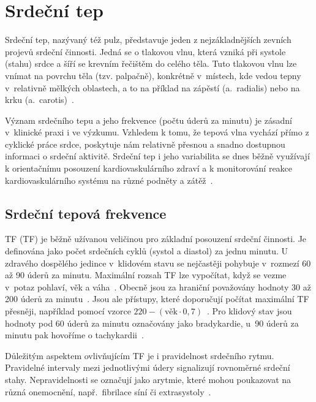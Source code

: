 \chapter{Srdeční tep}
\label{chap:srdecni_tep}

Srdeční tep, nazývaný též pulz, představuje jeden z nejzákladnějších zevních projevů srdeční činnosti.
Jedná se o tlakovou vlnu, která vzniká při systole (stahu) srdce a šíří se krevním řečištěm do celého těla.
Tuto tlakovou vlnu lze vnímat na povrchu těla (tzv. palpačně), konkrétně v~místech, kde vedou tepny v~relativně mělkých oblastech, a to na příklad na zápěstí (a.~radialis) nebo na krku (a.~carotis)~\cite{ENIKÖ,kocourekMourek}.

Význam srdečního tepu a jeho frekvence (počtu úderů za minutu) je zásadní v~klinické praxi i ve výzkumu.
Vzhledem k tomu, že tepová vlna vychází přímo z cyklické práce srdce, poskytuje nám relativně přesnou a snadno dostupnou informaci o srdeční aktivitě.
Srdeční tep i jeho variabilita se dnes běžně využívají k orientačnímu posouzení kardiovaskulárního zdraví a k monitorování reakce kardiovaskulárního systému na různé podněty a zátěž~\cite{faktoryOvlivnujiciTep}.

\section{Srdeční tepová frekvence}
\label{sec:STF}

\acl{TF} (\acs{TF}) je běžně užívanou veličinou pro základní posouzení srdeční činnosti.
Je definována jako počet srdečních cyklů (systol a diastol) za jednu minutu.
U zdravého dospělého jedince v~klidovém stavu se nejčastěji pohybuje v~rozmezí 60 až 90 úderů za minutu.
Maximální rozsah \acs{TF} lze vypočítat, když se vezme v~potaz pohlaví, věk a váha~\cite{ENIKÖ}. 
Obecně jsou za hraniční považovány hodnoty 30 až 200 úderů za minutu~\cite{PyPPG}.
Jsou ale přístupy, které doporučují počítat maximální \acs{TF} přesněji, například pomocí vzorce $220 - (\text{věk} \cdot 0,7)$~\cite{PoveaCabrera2018}.
Pro klidový stav jsou hodnoty pod 60 úderů za minutu označovány jako bradykardie, u~90 úderů za minutu pak hovoříme o tachykardii~\cite{ENIKÖ,vnitrniLekarstviVKostce}.

Důležitým aspektem ovlivňujícím \acs{TF} je i pravidelnost srdečního rytmu.
Pravidelné intervaly mezi jednotlivými údery signalizují rovnoměrné srdeční stahy.
Nepravidelnosti se označují jako arytmie, které mohou poukazovat na různá onemocnění, např.~fibrilace síní či extrasystoly~\cite{ENIKÖ}.

